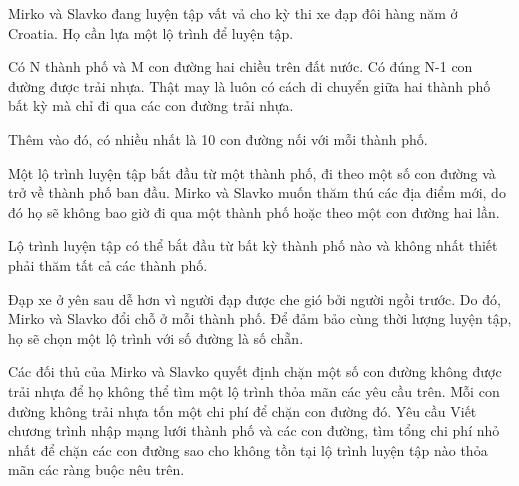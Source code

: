 Mirko và Slavko đang luyện tập vất vả cho kỳ thi xe đạp đôi hàng năm ở Croatia. Họ cần lựa một lộ trình để luyện tập.  

   Có N thành phố và M con đường hai chiều trên đất nước. Có đúng N-1 con đường được trải nhựa. Thật may là luôn có cách di chuyển giữa hai thành phố bất kỳ mà chỉ đi qua các con đường trải nhựa.  

   Thêm vào đó, có nhiều nhất là 10 con đường nối với mỗi thành phố.  

   Một lộ trình luyện tập bắt đầu từ một thành phố, đi theo một số con đường và trở về thành phố ban đầu. Mirko và Slavko muốn thăm thú các địa điểm mới, do đó họ sẽ không bao giờ đi qua một thành phố hoặc theo một con đường hai lần.  

   Lộ trình luyện tập có thể bắt đầu từ bất kỳ thành phố nào và không nhất thiết phải thăm tất cả các thành phố.  

   Đạp xe ở yên sau dễ hơn vì người đạp được che gió bởi người ngồi trước. Do đó, Mirko và Slavko đổi chỗ ở mỗi thành phố. Để đảm bảo cùng thời lượng luyện tập, họ sẽ chọn một lộ trình với số đường là số chẵn.  

   Các đối thủ của Mirko và Slavko quyết định chặn một số con đường không được trải nhựa để họ không thể tìm một lộ trình thỏa mãn các yêu cầu trên. Mỗi con đường không trải nhựa tốn một chi phí để chặn con đường đó.
   Yêu cầu  
Viết chương trình nhập mạng lưới thành phố và các con đường, tìm tổng chi phí nhỏ nhất để chặn các con đường sao cho không tồn tại lộ trình luyện tập nào thỏa mãn các ràng buộc nêu trên.